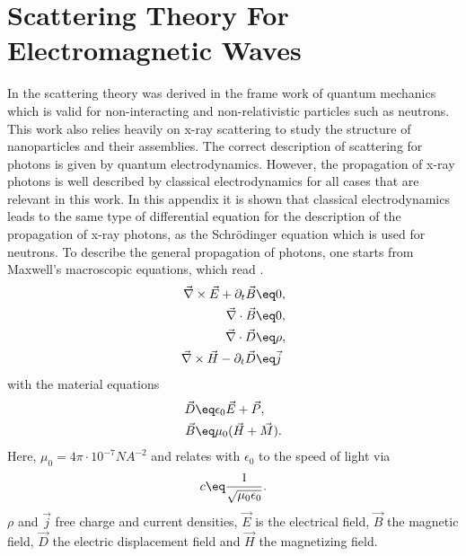 \documentclass[\main/dresen_thesis.tex]{subfiles}
\begin{document}
\section{Scattering Theory For Electromagnetic Waves}\label{ch:appendix:calculations:scatteringTheoryElectromagneticWaves}
In  the scattering theory was derived in the frame work of quantum mechanics which is valid for non-interacting and non-relativistic particles such as neutrons.
This work also relies heavily on x-ray scattering to study the structure of nanoparticles and their assemblies.
The correct description of scattering for photons is given by quantum electrodynamics.
However, the propagation of x-ray photons is well described by classical electrodynamics for all cases that are relevant in this work.
In this appendix it is shown that classical electrodynamics leads to the same type of differential equation for the description of the propagation of x-ray photons, as the Schr\"odinger equation which is used for neutrons.
To describe the general propagation of photons, one starts from Maxwell's macroscopic equations, which read \cite{Jackson_1999_Class}.
\begin{align}
  \vec{\nabla} \times \vec{E} + \partial_t \vec{B} \eq& 0,\\
  \vec{\nabla} \cdot \vec{B} \eq& 0,\\
  \vec{\nabla} \cdot \vec{D}  \eq& \rho,\\
  \vec{\nabla} \times \vec{H} - \partial_t \vec{D} \eq& \vec{j}
\end{align}
with the material equations
\begin{align}
  \vec{D} \eq& \epsilon_0 \vec{E} + \vec{P},\\
  \vec{B} \eq& \mu_0 (\vec{H} + \vec{M}).
\end{align}
Here, $\mu_0 = 4 \pi \cdot 10^{-7} \unit{N A^{-2}}$ and relates with $\epsilon_0$ to the speed of light via
\begin{equation}
  c \eq \frac{1}{\sqrt{\mu_0 \epsilon_0}}.
\end{equation}
$\rho$ and $\vec{j}$ free charge and current densities, $\vec{E}$ is the electrical field, $\vec{B}$ the magnetic field, $\vec{D}$ the electric displacement field and $\vec{H}$ the magnetizing field. 
\end{document}
